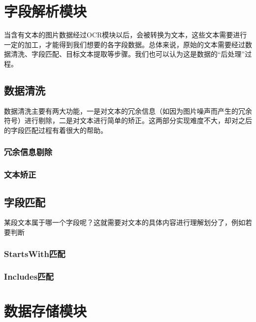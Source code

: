 \section{字段解析模块}  %
当含有文本的图片数据经过OCR模块以后，会被转换为文本，这些文本需要进行一定的加工，才能得到我们想要的各字段数据。总体来说，原始的文本需要经过数据清洗、字段匹配、目标文本提取等步骤。我们也可以认为这是数据的“后处理”过程。

\subsection{数据清洗}
数据清洗主要有两大功能，一是对文本的冗余信息（如因为图片噪声而产生的冗余符号）进行剔除，二是对文本进行简单的矫正。这两部分实现难度不大，却对之后的字段匹配过程有着很大的帮助。
\subsubsection{冗余信息剔除}
\subsubsection{文本矫正}

\subsection{字段匹配}
某段文本属于哪一个字段呢？这就需要对文本的具体内容进行理解划分了，例如若要判断
\subsubsection{StartsWith匹配}
\subsubsection{Includes匹配}


\section{数据存储模块} %
